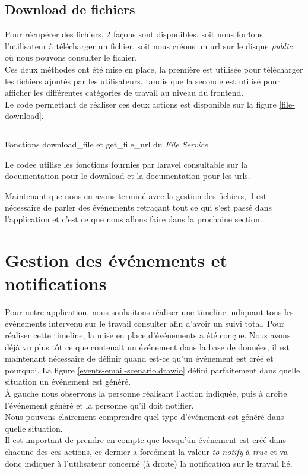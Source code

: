 \documentclass[
    iai, %
    il, %
]{heig-tb}
\begin{document}
\subsection{Download de fichiers}
Pour récupérer des fichiers, 2 façons sont disponibles, soit nous for4ons l'utilisateur à télécharger un fichier, soit nous créons un \Gls{url} sur le disque \emph{public} où nous pouvons consulter le fichier. \\
Ces deux méthodes ont été mise en place, la première est utilisée pour télécharger les fichiers ajoutés par les utilisateurs, tandis que la seconde est utilisé pour afficher les différentes catégories de travail au niveau du \Gls{frontend}. \\
Le code permettant de réaliser ces deux actions est disponible sur la figure \ref{file-download}.

\begin{listing}[h]
    \inputminted{php}{assets/code/FileDownload.php}
    \caption{Fonctions download\_file et get\_file\_url du \emph{File Service} \label{file-download}}
\end{listing}

Le codee utilise les fonctions fournies par \Gls{laravel} consultable sur la \href{https://laravel.com/docs/9.x/filesystem#downloading-files}{documentation pour le download} et la \href{https://laravel.com/docs/9.x/filesystem#file-urls}{documentation pour les urls}.

Maintenant que nous en avons terminé avec la gestion des fichiers, il est nécessaire de parler des événements retraçant tout ce qui s'est passé dans l'application et c'est ce que nous allons faire dans la prochaine section.

\section{Gestion des événements et notifications}
Pour notre application, nous souhaitons réaliser une timeline indiquant tous les événements intervenu sur le travail consulter afin d'avoir un suivi total. Pour réaliser cette timeline, la mise en place d'événements a été conçue. Nous avons déjà vu plus tôt ce que contenait un événement dans la base de données, il est maintenant nécessaire de définir quand est-ce qu'un événement est créé et pourquoi. La figure \ref{events-email-scenario.drawio} défini parfaitement dans quelle situation un événement est généré. \\
À gauche nous observons la personne réalisant l'action indiquée, puis à droite l'événement généré et la personne qu'il doit notifier. \\
Nous pouvons clairement comprendre quel type d'événement est généré dans quelle situation. \\
Il est important de prendre en compte que lorsqu'un événement est créé dans chacune des ces actions, ce dernier a forcément la valeur \emph{to notify} à \emph{true} et va donc indiquer à l'utilisateur concerné (à droite) la notification sur le travail lié.
\end{document}
